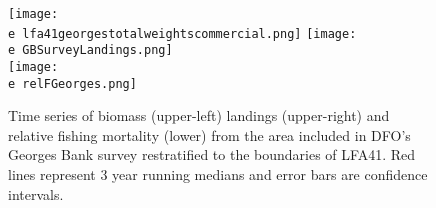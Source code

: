 \documentclass[11pt]{article}
\newcommand{\e}{/backup/bio_data/bio.lobster/figures/} %
\begin{document}
\begin{figure}
\centering
    \texttt{[image: \\e lfa41georgestotalweightscommercial.png]}
    \texttt{[image: \\e GBSurveyLandings.png]} \\
    \texttt{[image: \\e relFGeorges.png]} \\
    \caption{Time series of biomass (upper-left) landings (upper-right) and relative fishing mortality (lower) from the area included in DFO's Georges Bank survey restratified to the boundaries of LFA41. Red lines represent 3 year running medians and error bars are confidence intervals.}

\end{figure}
\end{document}
